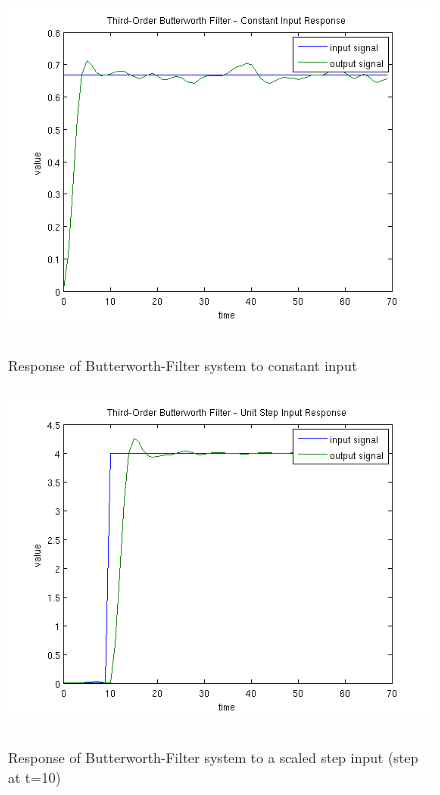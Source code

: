 \begin{figure}
\begin{center}
\includegraphics[height=9cm]{media/bw/bw_const_response}\\
\end{center}
\caption{Response of Butterworth-Filter system to constant input}
\label{bw_const_response}
\end{figure}

\begin{figure}
\begin{center}
\includegraphics[height=9cm]{media/bw/bw_step_response}\\
\end{center}
\caption{Response of Butterworth-Filter system to a scaled step input (step at t=10)}
\label{bw_step_response}
\end{figure}

